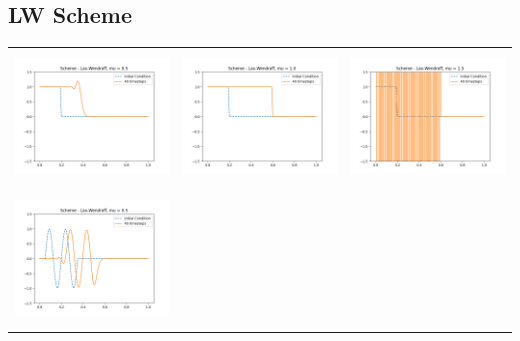 \documentclass[a4paper,twoside,11pt]{article}
\begin{document}
      \subsection*{LW Scheme}
      \begin{table}[!h]
          \centering
          \begin{tabular}{ | c | m{5cm} | m{5cm} | }
            \hline
            \begin{minipage}{.3\textwidth}
              \includegraphics[width=\linewidth, height=3.5cm]{../plots/scheme4-IC1-mu0_5.png}
            \end{minipage}
            &
            \begin{minipage}{.3\textwidth}
              \includegraphics[width=\linewidth, height=3.5cm]{../plots/scheme4-IC1-mu1_0.png}
            \end{minipage}
            &
            \begin{minipage}{.3\textwidth}
              \includegraphics[width=\linewidth, height=3.5cm]{../plots/scheme4-IC1-mu1_5.png}
            \end{minipage} \\
            \begin{minipage}{.3\textwidth}
              \includegraphics[width=\linewidth, height=3.5cm]{../plots/scheme4-IC2-mu0_5.png}

\end{minipage}
\end{tabular}
\end{table}
\end{document}
